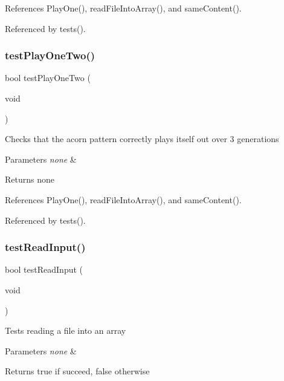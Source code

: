 References Play\+One(), read\+File\+Into\+Array(), and same\+Content().



Referenced by tests().

\mbox{\label{tests_8c_aaa5af386e80343cee306b7ae5709fc58}} 
\subsubsection{test\+Play\+One\+Two()}
{\footnotesize\ttfamily bool test\+Play\+One\+Two (\begin{DoxyParamCaption}\item[{void}]{ }\end{DoxyParamCaption})}

Checks that the acorn pattern correctly plays itself out over 3 generations 
\begin{DoxyParams}{Parameters}
{\em none} & \\
\hline
\end{DoxyParams}
\begin{DoxyReturn}{Returns}
none 
\end{DoxyReturn}


References Play\+One(), read\+File\+Into\+Array(), and same\+Content().



Referenced by tests().

\mbox{\label{tests_8c_aa89f64db87aebe77bd891e2894595e4e}} 
\subsubsection{test\+Read\+Input()}
{\footnotesize\ttfamily bool test\+Read\+Input (\begin{DoxyParamCaption}\item[{void}]{ }\end{DoxyParamCaption})}

Tests reading a file into an array 
\begin{DoxyParams}{Parameters}
{\em none} & \\
\hline
\end{DoxyParams}
\begin{DoxyReturn}{Returns}
true if succeed, false otherwise 
\end{DoxyReturn}


